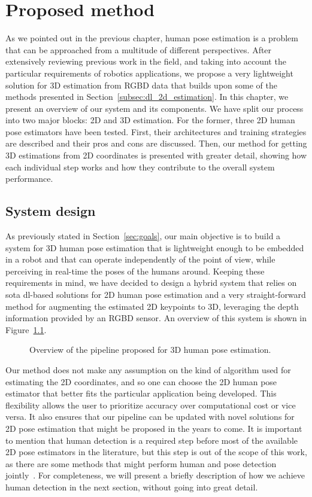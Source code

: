 \chapter{Proposed method}\label{ch:proposed_method}
As we pointed out in the previous chapter, human pose estimation is a problem that can be approached from a multitude of different perspectives. After extensively reviewing previous work in the field, and taking into account the particular requirements of robotics applications, we propose a very lightweight solution for 3D estimation from RGBD data that builds upon some of the methods presented in Section~\ref{subsec:dl_2d_estimation}. In this chapter, we present an overview of our system and its components. We have split our process into two major blocks: 2D and 3D estimation. For the former, three 2D human pose estimators have been tested. First, their architectures and training strategies are described and their pros and cons are discussed. Then, our method for getting 3D estimations from 2D coordinates is presented with greater detail, showing how each individual step works and how they contribute to the overall system performance. 

\section{System design}
As previously stated in Section~\ref{sec:goals}, our main objective is to build a system for 3D human pose estimation that is lightweight enough to be embedded in a robot and that can operate independently of the point of view, while perceiving in real-time the poses of the humans around. Keeping these requirements in mind, we have decided to design a hybrid system that relies on \gls{sota} \gls{dl}-based solutions for 2D human pose estimation and a very straight-forward method for augmenting the estimated 2D keypoints to 3D, leveraging the depth information provided by an RGBD sensor. An overview of this system is shown in Figure~\ref{fig:system_design}.

\begin{figure}[h]
    \centering
    
    \caption{Overview of the pipeline proposed for 3D human pose estimation.}
    \label{fig:system_design}
\end{figure}

Our method does not make any assumption on the kind of algorithm used for estimating the 2D coordinates, and so one can choose the 2D human pose estimator that better fits the particular application being developed. This flexibility allows the user to prioritize accuracy over computational cost or vice versa. It also ensures that our pipeline can be updated with novel solutions for 2D pose estimation that might be proposed in the years to come. It is important to mention that human detection is a required step before most of the available 2D pose estimators in the literature, but this step is out of the scope of this work, as there are some methods that might perform human and pose detection jointly~\cite{cao2018openpose}. For completeness, we will present a briefly description of how we achieve human detection in the next section, without going into great detail.

